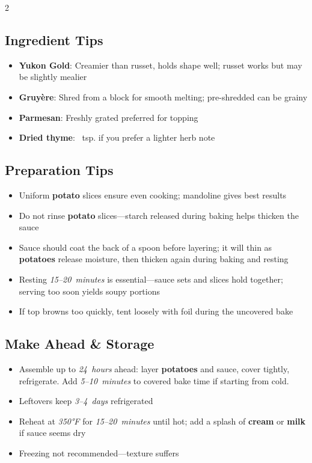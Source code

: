 \documentclass[11pt,letterpaper]{article}
\begin{document}
{\begin{multicols}{2}
\subsection*{Ingredient Tips}
\begin{itemize}
    \item \textbf{Yukon Gold}: Creamier than russet, holds shape well; russet works but may be slightly mealier
    \item \textbf{Gruyère}: Shred from a block for smooth melting; pre-shredded can be grainy
    \item \textbf{Parmesan}: Freshly grated preferred for topping
    \item \textbf{Dried thyme}: ~tsp. if you prefer a lighter herb note
\end{itemize}

\subsection*{Preparation Tips}
\begin{itemize}
    \item Uniform \textbf{potato} slices ensure even cooking; mandoline gives best results
    \item Do not rinse \textbf{potato} slices---starch released during baking helps thicken the sauce
    \item Sauce should coat the back of a spoon before layering; it will thin as \textbf{potatoes} release moisture, then thicken again during baking and resting
    \item Resting \textit{15--20~minutes} is essential---sauce sets and slices hold together; serving too soon yields soupy portions
    \item If top browns too quickly, tent loosely with foil during the uncovered bake
\end{itemize}

\subsection*{Make Ahead \& Storage}
\begin{itemize}
    \item Assemble up to \textit{24~hours} ahead: layer \textbf{potatoes} and sauce, cover tightly, refrigerate. Add \textit{5--10~minutes} to covered bake time if starting from cold.
    \item Leftovers keep \textit{3--4~days} refrigerated
    \item Reheat at \textit{350°F} for \textit{15--20~minutes} until hot; add a splash of \textbf{cream} or \textbf{milk} if sauce seems dry
    \item Freezing not recommended---texture suffers
\end{itemize}


\end{multicols}}
\end{document}
